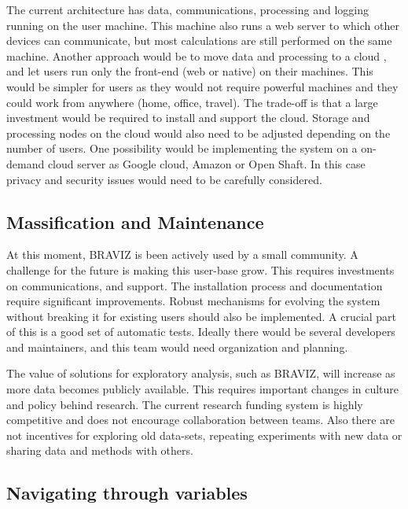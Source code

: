 {The current architecture has data, communications, processing and logging running on the user machine. This machine also runs a web server to  which other devices can communicate, but most calculations are still performed on the same machine. Another approach would be to move data and processing to a cloud , and let users run only the front-end (web or native) on their machines. This would be simpler for users as they would not require powerful machines and they could work from anywhere (home, office, travel). The trade-off is that a large investment would be required  to install and support the cloud. Storage and processing nodes on the cloud would also need to be adjusted depending on the number of users. One possibility would be implementing the system on a on-demand cloud server as Google cloud, Amazon or Open Shaft. In this case privacy and security issues would need to be carefully considered. 


\subsection{Massification and Maintenance}

At this moment, BRAVIZ is been actively used by a small community. A challenge for the future is making this user-base grow. This requires investments on communications, and support. The installation process and documentation require significant improvements. Robust mechanisms for evolving the system without breaking it for existing users should also be implemented. A crucial part of this is a good set of automatic tests. Ideally there would be several developers and maintainers, and this team would need organization and planning.

The value of solutions for exploratory analysis, such as BRAVIZ, will increase as more data becomes publicly available. This requires important changes in  culture and policy behind research. The current research funding system is highly competitive and does not encourage collaboration between teams. Also there are not incentives for exploring old data-sets, repeating experiments with new data or sharing data and methods with others. 

\subsection{Navigating through variables}

}
